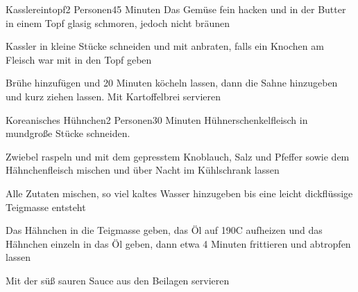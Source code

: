 
\begin{recipe}{Kasslereintopf}{2 Personen}{45 Minuten}
Das Gemüse fein hacken und in der Butter in einem Topf glasig schmoren, jedoch nicht bräunen

Kassler in kleine Stücke schneiden und mit anbraten, falls ein Knochen am Fleisch war mit in den Topf geben

Brühe hinzufügen und 20 Minuten köcheln lassen, dann die Sahne hinzugeben und kurz ziehen lassen.
Mit Kartoffelbrei servieren
\end{recipe}


\begin{recipe}{Koreanisches Hühnchen}{2 Personen}{30 Minuten}
Hühnerschenkelfleisch in mundgroße Stücke schneiden. 

Zwiebel raspeln und mit dem gepresstem Knoblauch, Salz und Pfeffer sowie dem Hähnchenfleisch mischen und über Nacht im Kühlschrank lassen


Alle Zutaten mischen, so viel kaltes Wasser hinzugeben bis eine leicht dickflüssige Teigmasse entsteht

Das Hähnchen in die Teigmasse geben, das Öl auf 190\0C aufheizen und das Hähnchen einzeln in das Öl geben, dann etwa 4 Minuten frittieren und abtropfen lassen

Mit der süß sauren Sauce aus den Beilagen servieren
\end{recipe}


